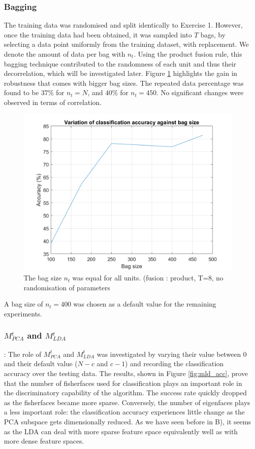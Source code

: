 \documentclass[10pt,technote]{IEEEtran}
\begin{document}
\subsubsection{Bagging}

The training data was randomised and split identically to Exercise 1. However, once the training data had been obtained, it was sampled into $T$ bags, by selecting a data point uniformly from the training dataset, with replacement. We denote the amount of data per bag with $n_t$. Using the product fusion rule, this bagging technique contributed to the randomness of each unit and thus their decorrelation, which will be investigated later. Figure \ref{fig:acc_vs_bag} highlights the gain in robustness that comes with bigger bag sizes. The repeated data percentage was found to be $37 \%$ for $n_t = N$, and $40 \%$ for $n_t = 450$. No significant changes were observed in terms of correlation.
\begin{figure}[htb!]
    \centering
    \includegraphics[width=\linewidth]{../results/ex2LDAEnsemble/acc_vs_bag_size.png}
    \caption{The bag size $n_t$ was equal for all units. (fusion : product, T=8, no randomisation of parameters}
    \label{fig:acc_vs_bag}
\end{figure}

A bag size of $n_t = 400$ was chosen as a default value for the remaining experiments.

\subsubsection{$M_{PCA}^t$ and $M_{LDA}^t$}:
The role of $M_{PCA}^t$ and $M_{LDA}^t$ was investigated by varying their value between 0 and their default value ($N - c$ and $c - 1$) and recording the classification accuracy over the testing data. The results, shown in Figure \ref{fig:mld_acc}, prove that the number of fisherfaces used for classification plays an important role in the discriminatory capability of the algorithm. The success rate quickly dropped as the fisherfaces became more sparse. Conversely, the number of eigenfaces plays a less important role: the classification accuracy experiences little change as the PCA subspace gets dimensionally reduced. As we have seen before in B), it seems as the LDA can deal with more sparse feature space equivalently well as with more dense feature spaces.
\end{document}
